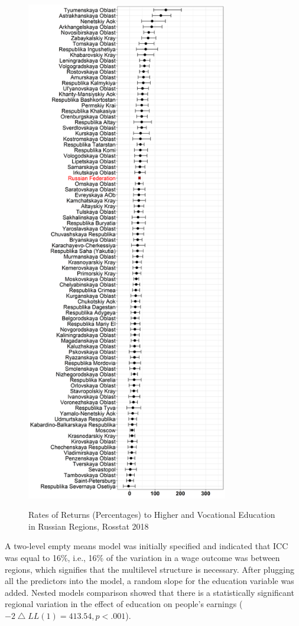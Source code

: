 \documentclass[12pt,a4paper]{article}
\numberwithin{equation}{section}
\begin{document}
\begin{figure}[h!]
\begin{minipage}[b]{.5\linewidth}
		\includegraphics[width=250pt]{reg_ve_18.png}
		\label{}
	\end{minipage}
	\caption{Rates of Returns (Percentages) to Higher and Vocational Education in Russian Regions, Rosstat 2018}\label{fig:7}
\end{figure}

A two-level empty means model was initially specified and indicated that ICC was equal to 16\%, i.e., 16\% of the variation in a wage outcome was between regions, which signifies that the multilevel structure is necessary. After plugging all the predictors into the model,  a random slope for the education variable was added. Nested models comparison showed that there is a statistically significant regional variation in the effect of education on people's earnings ($-2\bigtriangleup LL(1) = 413.54, p < .001$).
\end{document}
